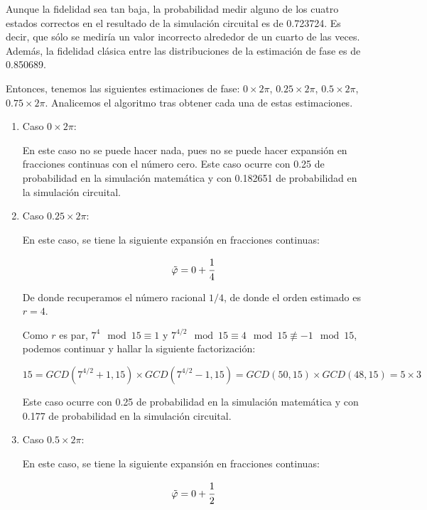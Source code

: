 Aunque la fidelidad sea tan baja, la probabilidad medir alguno de los cuatro estados correctos en el resultado de la simulación circuital es de 0.723724. Es decir, que sólo se mediría un valor incorrecto alrededor de un cuarto de las veces. Además, la fidelidad clásica entre las distribuciones de la estimación de fase es de 0.850689.

Entonces, tenemos las siguientes estimaciones de fase: $0 \times 2\pi$, $0.25 \times 2\pi$, $0.5 \times 2\pi$, $0.75 \times 2\pi$. Analicemos el algoritmo tras obtener cada una de estas estimaciones.

\begin{enumerate}
    \item Caso $0 \times 2\pi$:

        En este caso no se puede hacer nada, pues no se puede hacer expansión en fracciones continuas con el número cero. Este caso ocurre con 0.25 de probabilidad en la simulación matemática y con 0.182651 de probabilidad en la simulación circuital.

    \item Caso $0.25 \times 2\pi$:

        En este caso, se tiene la siguiente expansión en fracciones continuas:
        
        \begin{equation}
            \tilde{\varphi} = 0 + \cfrac{1}{4}
        \end{equation}
        
        De donde recuperamos el número racional $1/4$, de donde el orden estimado es $r = 4$.

        Como $r$ es par, $7^{4}\mod 15 \equiv 1$ y $7^{4/2}\mod 15 \equiv 4\mod 15 \not\equiv -1\mod 15$, podemos continuar y hallar la siguiente factorización:

        \begin{equation}
            15 = GCD(7^{4/2} + 1, 15) \times GCD(7^{4/2} - 1, 15) = GCD(50, 15) \times GCD(48, 15) = 5 \times 3
        \end{equation}

        Este caso ocurre con 0.25 de probabilidad en la simulación matemática y con 0.177 de probabilidad en la simulación circuital.

    \item Caso $0.5 \times 2\pi$:

        En este caso, se tiene la siguiente expansión en fracciones continuas:

        \begin{equation}
            \tilde{\varphi} = 0 + \cfrac{1}{2}
        \end{equation}
        

\end{enumerate}
